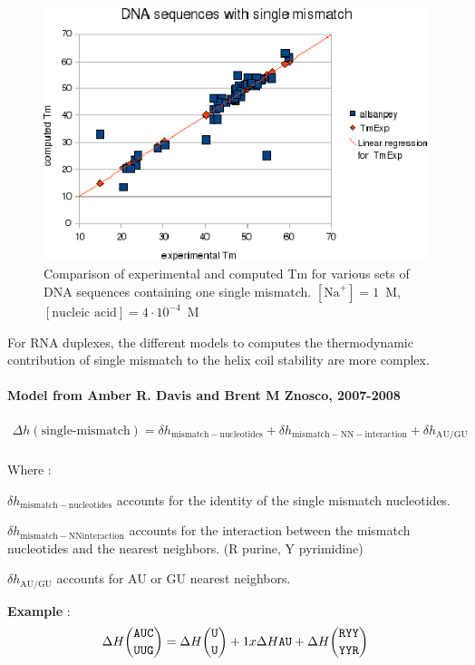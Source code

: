 \documentclass{article}
\begin{document}
\begin{figure}[h]
\includegraphics[width=1\linewidth]{images/DNASingleMismatch}
\caption{Comparison of experimental and computed Tm for various sets of
 DNA sequences containing one single mismatch. $[\mbox{Na}^+] = 1$~M, $[\mbox{nucleic acid}] = 4\cdot{}10^{-4}$~M}
\end{figure}

For RNA duplexes, the different models to computes the thermodynamic contribution of single mismatch to the helix coil 
stability are more complex.


\paragraph{\textbf{Model from Amber R. Davis and Brent M Znosco, 2007-2008}}

\begin{multline*}
\Delta h {(\mbox{single-mismatch})} = 
\delta{}h_\mathrm{mismatch-nucleotides} +
\delta{}h_\mathrm{mismatch-NN-interaction} +
\delta{}h_\mathrm{AU/GU} \\
\end{multline*}

Where :

$\delta{}h_\mathrm{mismatch-nucleotides}$ accounts for the identity of the single mismatch nucleotides.

$\delta{}h_\mathrm{mismatch-NN interaction}$ accounts for the interaction between the mismatch nucleotides and 
the nearest neighbors. (R purine, Y pyrimidine)

$\delta{}h_\mathrm{AU/GU}$ accounts for AU or GU nearest neighbors.

\textbf{Example} :
\begin{multline*}
\Delta H {\mbox{\texttt{AUC}} \choose \mbox{\texttt{UUG}}} = 
\Delta H {\mbox{\texttt{U}} \choose \mbox{\texttt{U}} } + 
1 x \Delta H {\mbox{\texttt{AU}} } +
\Delta H {\mbox{\texttt{RYY}} \choose \mbox{\texttt{YYR}} } \\
\end{multline*}
\end{document}
